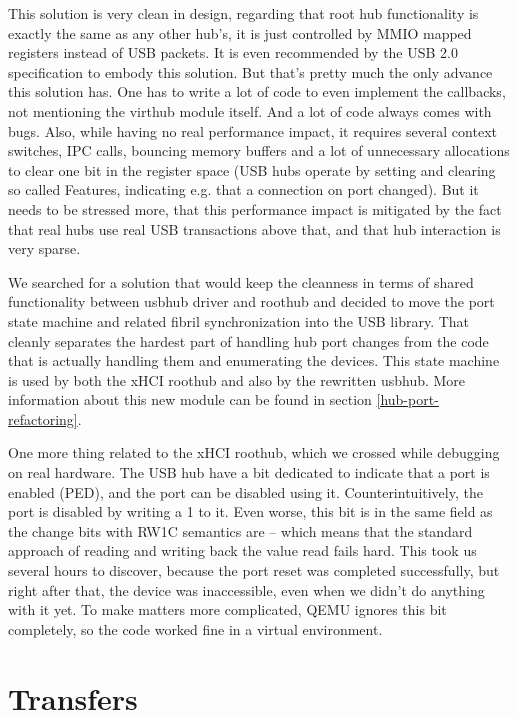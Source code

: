 This solution is very clean in design, regarding that root hub functionality is
exactly the same as any other hub's, it is just controlled by MMIO mapped
registers instead of USB packets. It is even recommended by the USB 2.0			%
specification to embody this solution. But that's pretty much the only advance
this solution has. One has to write a lot of code to even implement the
callbacks, not mentioning the virthub module itself. And a lot of code always
comes with bugs. Also, while having no real performance impact, it requires
several context switches, IPC calls, bouncing memory buffers and a lot of
unnecessary allocations to clear one bit in the register space (USB hubs
operate by setting and clearing so called Features, indicating e.g. that
a connection on port changed). But it needs to be stressed more, that this
performance impact is mitigated by the fact that real hubs use real USB transactions
above that, and that hub interaction is very sparse.

We searched for a solution that would keep the cleanness in terms of shared
functionality between usbhub driver and roothub and decided to move the port
state machine and related fibril synchronization into the USB library. That
cleanly separates the hardest part of handling hub port changes from the code
that is actually handling them and enumerating the devices. This state machine
is used by both the xHCI roothub and also by the rewritten usbhub. More
information about this new module can be found in section \ref{hub-port-refactoring}.

One more thing related to the xHCI roothub, which we crossed while debugging on
real hardware. The USB hub have a bit dedicated to indicate that a port is
enabled (PED), and the port can be disabled using it. Counterintuitively, the
port is disabled by writing a 1 to it. Even worse, this bit is in the same
field as the change bits with RW1C semantics are -- which means that the
standard approach of reading and writing back the value read fails hard. This
took us several hours to discover, because the port reset was completed
successfully, but right after that, the device was inaccessible, even when we
didn't do anything with it yet. To make matters more complicated, QEMU ignores
this bit completely, so the code worked fine in a virtual environment.


\section{Transfers}

